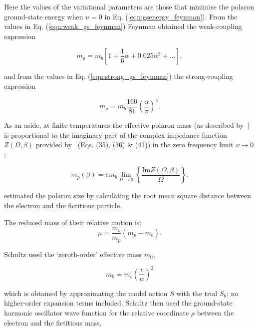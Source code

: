 Here the values of the variational parameters are those that minimise the polaron ground-state energy when $u = 0$ in Eq. (\ref{eqn:gsenergy_feynman}). From the values in Eq. (\ref{eqn:weak_gs_feynman}) Feynman obtained the weak-coupling expression 

\begin{equation}
    \label{eqn:weak_mass_feynman}
    m_p = m_b \left[ 1 + \frac{1}{6} \alpha + 0.025 \alpha^2 + \dots \right] ,
\end{equation}

and from the values in Eq. (\ref{eqn:strong_gs_feynman}) the strong-coupling expression

\begin{equation}
    \label{eqn:strong_mass_feynman}
    m_p = m_b \frac{160}{81} \left(\frac{\alpha}{\pi}\right)^4.
\end{equation}

As an aside, at finite temperatures the effective polaron mass (as described by~\cite{peeters_theory_1984}) is proportional to the imaginary part of the complex impedance function $Z(\Omega, \beta)$ provided by~\cite{feynman_mobility_1962} (Eqs. (35), (36) \& (41)) in the zero frequency limit $\nu \to 0$:

\begin{equation}
    m_p(\beta) =  e m_b \lim_{\Omega \to 0} \left\{ \frac{\text{Im} Z(\Omega, \beta)}{\Omega} \right\}.
\end{equation}

\cite{schultz_slow_1959} estimated the polaron size by calculating the root mean square distance between the electron and the fictitious particle. 

The reduced mass of their relative motion is:
\begin{equation}
    \label{eqn:red_mass_schultz}
    \mu = \frac{m_b}{m_p} (m_p - m_b).
\end{equation}

Schultz used the `zeroth-order' effective mass $m_0$,

\begin{equation}
     m_0 = m_b \left(\frac{v}{w}\right)^2
\end{equation}

which is obtained by approximating the model action $S$ with the trial $S_0$; no higher-order expansion terms included. Schultz then used the ground-state harmonic oscillator wave function for the relative coordinate $\rho$ between the electron and the fictitious mass,


